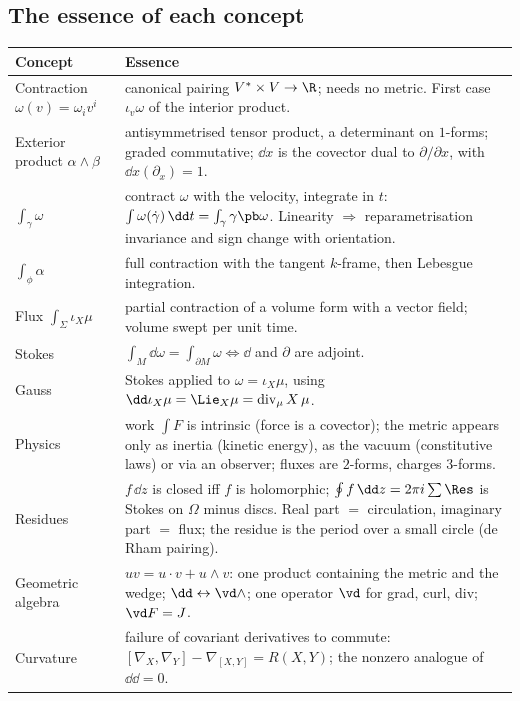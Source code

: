 \subsection{The essence of each concept}

{\small
\renewcommand{\arraystretch}{1.3}
\begin{longtable}{@{}p{3.6cm}p{10.4cm}@{}}
\toprule
\textbf{Concept} & \textbf{Essence}\\
\midrule
\endhead
Contraction $\omega(v)=\omega_iv^i$ & canonical pairing $V^*\times V\to\R$; needs no metric. First case $\iota_v\omega$ of the interior product.\\
Exterior product $\alpha\wedge\beta$ & antisymmetrised tensor product, a determinant on $1$-forms; graded commutative; $\dd x$ is the covector dual to $\partial/\partial x$, with $\dd x(\partial_x)=1$.\\
$\int_\gamma\omega$ & contract $\omega$ with the velocity, integrate in $t$: $\int\omega(\dot\gamma)\,\dd t=\int_\gamma\gamma\pb\omega$. Linearity $\Rightarrow$ reparametrisation invariance and sign change with orientation.\\
$\int_\phi\alpha$ & full contraction with the tangent $k$-frame, then Lebesgue integration.\\
Flux $\int_\Sigma\iota_X\mu$ & partial contraction of a volume form with a vector field; volume swept per unit time.\\
Stokes & $\int_M\dd\omega=\int_{\partial M}\omega\iff\dd$ and $\partial$ are adjoint.\\
Gauss & Stokes applied to $\omega=\iota_X\mu$, using $\dd\iota_X\mu=\Lie_X\mu=\operatorname{div}_\mu X\,\mu$.\\
Physics & work $\int F$ is intrinsic (force is a covector); the metric appears only as inertia (kinetic energy), as the vacuum (constitutive laws) or via an observer; fluxes are $2$-forms, charges $3$-forms.\\
Residues & $f\,\dd z$ is closed iff $f$ is holomorphic; $\oint f\,\dd z=2\pi i\sum\Res$ is Stokes on $\Omega$ minus discs. Real part $=$ circulation, imaginary part $=$ flux; the residue is the period over a small circle (de Rham pairing).\\
Geometric algebra & $uv=u\cdot v+u\wedge v$: one product containing the metric and the wedge; $\dd\leftrightarrow\vd\wedge$; one operator $\vd$ for grad, curl, div; $\vd F=J$.\\
Curvature & failure of covariant derivatives to commute: $[\nabla_X,\nabla_Y]-\nabla_{[X,Y]}=R(X,Y)$; the nonzero analogue of $\dd\dd=0$.\\
\bottomrule
\end{longtable}}
